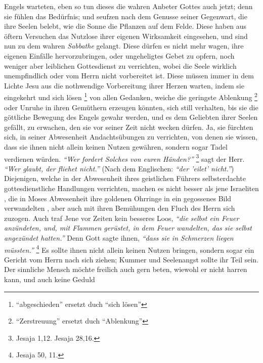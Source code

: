 Engels warteten, eben so tun dieses die wahren Anbeter Gottes auch jetzt; denn
sie fühlen das Bedürfnis; und seufzen nach dem Genusse seiner Gegenwart, die
ihre Seelen belebt, wie die Sonne die Pflanzen auf dem Felde. Diese haben aus
öftern Versuchen das Nutzlose ihrer eigenen Wirksamkeit eingesehen, und sind nun
zu dem wahren \textit{Sabbathe}  gelangt. Diese dürfen es nicht
mehr wagen, ihre
eigenen Einfälle hervorzubringen, oder ungeheligtes Gebet zu opfern, noch
weniger aber leiblichen Gottesdienst zu verrichten, wobei die Seele wirklich
unempfindlich oder vom Herrn nicht vorbereitet ist. Diese müssen immer in dem
Lichte Jesu  aus die nothwendige Vorbereitung ihrer Herzen
warten, indem sie
eingekehrt und sich lösen \footnote{"`abgeschieden"' ersetzt duch "`sich
lösen"'} von allen Gedanken, weiche die geringste Ablenkung
\footnote{"`Zerstreuung"' ersetzt duch "`Ablenkung"'}
oder Unruhe in ihren Gemüthern erzeugen könnten, sich still verhalten, bis sie
die göttliche Bewegung des Engels gewahr werden, und es dem Geliebten ihrer
Seelen gefällt, zu erwachen, den sie vor seiner Zeit nicht wecken dürfen. Ja,
sie fürchten sich, in seiner Abwesenheit Andachtsübungen zu verrichten, von
denen sie wissen, dass sie ihnen nicht allein keinen Nutzen gewähren, sondern
sogar Tadel verdienen würden.
\textit{"`Wer fordert Solches von euren Händen?"'}
\footnote{Jesaja 1,12. Jesaja 28,16.}
sagt der Herr.
\textit{"`Wer glaubt, der fliehet nicht."'} (Nach dem Englischen: \textit{"`der
'eilet' nicht."'}) Diejenigen,
welche in der Abwesenheit ihres geistlichen Führers selbsterdachte
gottesdienstliche Handlungen verrichten, machen es nicht besser als jene
Israeliten , die in Moses 
Abwesenheit ihre goldenen Ohrringe in ein
gegossenes Bild verwandelten , aber auch mit ihren
Bemühungen den Fluch  des Herrn sich zuzogen. Auch traf Jene vor
Zeiten kein besseres Loos,
\textit{"`die selbst ein Feuer anzündeten, und, mit Flammen gerüstet, in dem
Feuer wandelten, das sie
selbst angezündet hatten."'} Denn Gott sagte ihnen,
\textit{"`dass sie in Schmerzen liegen müssten."'}
\footnote{Jesaja 50, 11.}
Es sollte ihnen nicht allein keinen
Nutzen bringen, sondern sogar ein Gericht vom Herrn nach sich ziehen; Kummer und
Seelenangst sollte ihr Teil sein. Der sinnliche Mensch  möchte freilich auch
gern beten, wiewohl er nicht harren kann, und auch keine Geduld 
